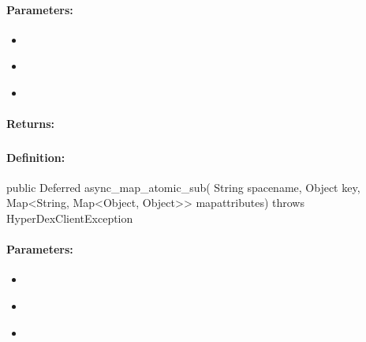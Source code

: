 \paragraph{Parameters:}
\begin{itemize}[noitemsep]
\item {}\\

\item {}\\

\item {}\\

\end{itemize}

\paragraph{Returns:}


\pagebreak
\subsubsection{}
\label{api:java:async_map_atomic_sub}


\paragraph{Definition:}
\begin{javacode}
public Deferred async_map_atomic_sub(
        String spacename,
        Object key,
        Map<String, Map<Object, Object>> mapattributes) throws HyperDexClientException
\end{javacode}

\paragraph{Parameters:}
\begin{itemize}[noitemsep]
\item {}\\

\item {}\\

\item {}\\

\end{itemize}

